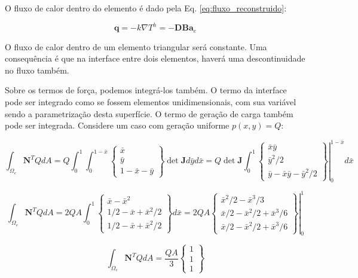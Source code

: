         O fluxo de calor dentro do elemento é dado pela Eq. \eqref{eq:fluxo_reconstruido}:

        \begin{equation*}
            \mathbf{q} = - k \nabla T^h = - \mathbf{D} \mathbf{B} \mathbf{a}_e
        \end{equation*}

        O fluxo de calor dentro de um elemento triangular será constante. Uma consequência é que na interface entre dois elementos, haverá uma descontinuidade no fluxo também.

        Sobre os termos de força, podemos integrá-los também. O termo da interface pode ser integrado como se fossem elementos unidimensionais, com sua variável sendo a parametrização desta superfície. O termo de geração de carga também pode ser integrada. Considere um caso com geração uniforme $p(x,y) = Q$:


        \begin{equation*}
            \int_{\Omega_e} \mathbf{N}^T Q dA = 
            Q \int_{0}^{1} \int_{0}^{1-\bar{x}} 
            \begin{Bmatrix}
                \bar{x}\\
                \bar{y}\\
                1-\bar{x}-\bar{y}
            \end{Bmatrix} \det \mathbf{J} d\bar{y} d\bar{x} = 
            Q \det \mathbf{J} \int_{0}^{1} \left.
            \begin{Bmatrix}
                \bar{x}\bar{y}\\
                \bar{y}^2/2\\
                \bar{y}-\bar{x}\bar{y}-\bar{y}^2/2
            \end{Bmatrix} \right|_{0}^{1-\bar{x}}  d\bar{x}
        \end{equation*}

        \begin{equation*}
             \int_{\Omega_e} \mathbf{N}^T Q dA = 2QA\int_{0}^{1} 
            \begin{Bmatrix}
                \bar{x}-\bar{x}^2\\
                1/2 - \bar{x} + \bar{x}^2/2\\
                1/2 - \bar{x} + \bar{x}^2/2
            \end{Bmatrix}  d\bar{x} = 
             2QA \left.
            \begin{Bmatrix}
                \bar{x}^2/2-\bar{x}^3/3\\
                \bar{x}/2 - \bar{x}^2/2 + \bar{x}^3/6\\
                \bar{x}/2 - \bar{x}^2/2 + \bar{x}^3/6
            \end{Bmatrix}  \right|_{0}^{1} 
        \end{equation*}

        \begin{equation*}
             \int_{\Omega_e} \mathbf{N}^T Q dA =
             \frac{QA}{3}
            \begin{Bmatrix}
                1\\
                1\\
                1
            \end{Bmatrix}
        \end{equation*}

